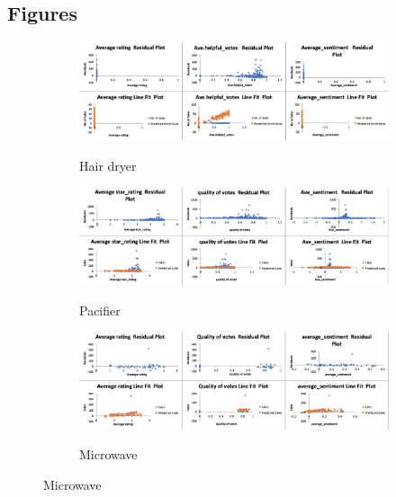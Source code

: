 \documentclass[reqno]{article}
\theoremstyle{definition}
\theoremstyle{definition}
\theoremstyle{remark}
\begin{document}
\subsection{Figures}
\begin{figure}[htbp]
\caption{Lines and residuals plots for 3 products:}
\begin{subfigure}{\textwidth}
    \includegraphics[width= 1\linewidth]{hair_dryer_lines_residuals}
    \label{fig:sfig1}
    \caption{Hair dryer}
    \includegraphics[width= 1\linewidth]{pacifier_lines_residuals}
    \label{fig:sfig2}
    \caption{Pacifier}
    \includegraphics[width= 1\linewidth]{microwave_lines_residuals}
    \label{fig:sfig3}
    \caption{Microwave}
\end{subfigure}%
\end{figure}
\end{document}
